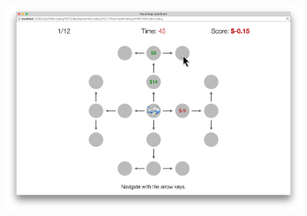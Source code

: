 \documentclass[final]{beamer}
\newlength{\twocolwid}
\begin{document}
\begin{frame}[t, fragile]
\begin{columns}[t]
\begin{column}{\twocolwid}
  \begin{figure}
    \label{fig:main}
    \includegraphics[width=0.85\linewidth]{figs/example1.png}
  \end{figure}

  \vspace{-1cm}


\end{column}
\end{columns}
\end{frame}
\end{document}
